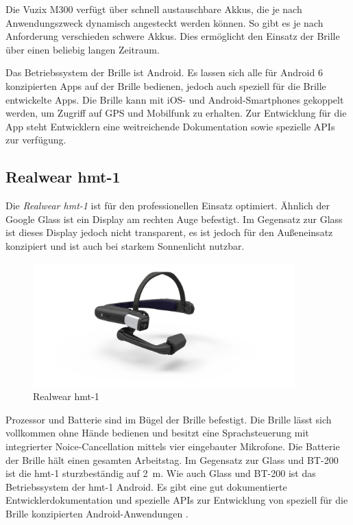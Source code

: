 Die Vuzix M300 verfügt über schnell austauschbare Akkus, die je nach Anwendungszweck dynamisch angesteckt werden können. So gibt es je nach Anforderung verschieden schwere Akkus. Dies ermöglicht den Einsatz der Brille über einen beliebig langen Zeitraum.

Das Betriebssystem der Brille ist Android. Es lassen sich alle für Android 6 konzipierten Apps auf der Brille bedienen, jedoch auch speziell für die Brille entwickelte Apps. Die Brille kann mit iOS- und Android-Smartphones gekoppelt werden, um Zugriff auf GPS und Mobilfunk zu erhalten. Zur Entwicklung für die App steht Entwicklern eine weitreichende Dokumentation sowie spezielle APIs zur verfügung. \cite{Vuzix2018}
%
\subsection{Realwear hmt-1}
Die \emph{Realwear hmt-1} ist für den professionellen Einsatz optimiert. Ähnlich der Google Glass ist ein Display am rechten Auge befestigt. Im Gegensatz zur Glass ist dieses Display jedoch nicht transparent, es ist jedoch für den Außeneinsatz konzipiert und ist auch bei starkem Sonnenlicht nutzbar. 
%
\begin{figure}[htbp]
    \centering
    \includegraphics[width=0.9\textwidth]{data/bilder/HMT_1.jpg}
    \caption{Realwear hmt-1 \cite{Wire2017}}
    \label{fig:hmt1}
\end{figure}
%

Prozessor und Batterie sind im Bügel der Brille befestigt. Die Brille lässt sich vollkommen ohne Hände bedienen und besitzt eine Sprachsteuerung mit integrierter Noice-Cancellation mittels vier eingebauter Mikrofone. Die Batterie der Brille hält einen gesamten Arbeitstag. Im Gegensatz zur Glass und BT-200 ist die hmt-1 sturzbeständig auf 2~m. Wie auch Glass und BT-200 ist das Betriebssystem der hmt-1 Android. Es gibt eine gut dokumentierte Entwicklerdokumentation und spezielle APIs zur Entwicklung von speziell für die Brille konzipierten Android-Anwendungen \cite{Realwear2018}.